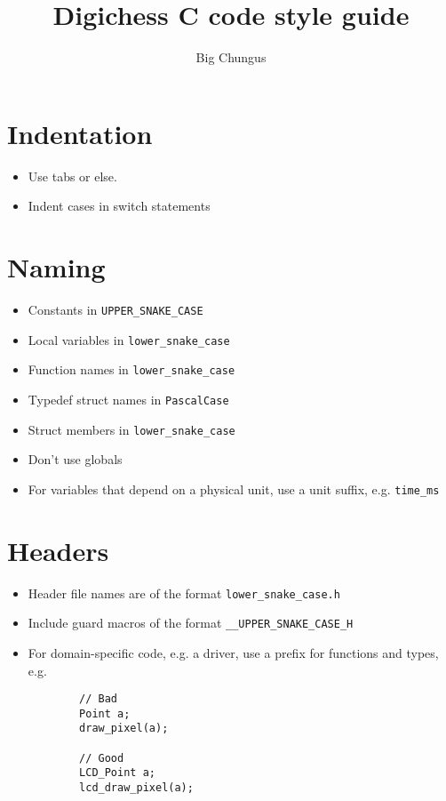 \documentclass{article}
\title{Digichess C code style guide}
\author{Big Chungus}
\begin{document}
\maketitle

\section{Indentation}

\begin{itemize}
	\item Use tabs or else.
	\item Indent cases in switch statements
\end{itemize}

\section{Naming}

\begin{itemize}
	\item Constants in \lstinline{UPPER_SNAKE_CASE}
	\item Local variables in \lstinline{lower_snake_case}
	\item Function names in \lstinline{lower_snake_case}
	\item Typedef struct names in \lstinline{PascalCase}
	\item Struct members in \lstinline{lower_snake_case}
	\item Don't use globals
	\item For variables that depend on a physical unit, use a unit suffix, e.g. \lstinline{time_ms}
\end{itemize}

\section{Headers}

\begin{itemize}
	\item Header file names are of the format \lstinline{lower_snake_case.h}
	\item Include guard macros of the format \lstinline{__UPPER_SNAKE_CASE_H}
	\item For domain-specific code, e.g. a driver, use a prefix for functions and types, e.g.
	
	\begin{lstlisting}
		// Bad
		Point a;
		draw_pixel(a);

		// Good
		LCD_Point a;
		lcd_draw_pixel(a);
	\end{lstlisting}
\end{itemize}
\end{document}
